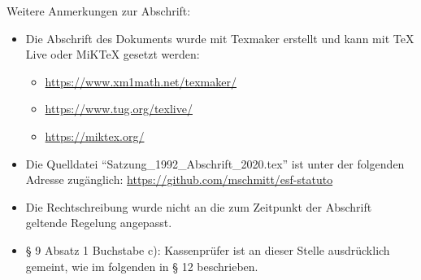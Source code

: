 \documentclass[11pt]{article}
\begin{document}
\begin{appendix}
Weitere Anmerkungen zur Abschrift:
\begin{itemize}
	\item Die Abschrift des Dokuments wurde mit Texmaker erstellt und kann mit TeX Live oder MiKTeX gesetzt werden:
	\begin{itemize}
		\item \url{https://www.xm1math.net/texmaker/}
		\item \url{https://www.tug.org/texlive/}
		\item \url{https://miktex.org/}
	\end{itemize}
	\item Die Quelldatei "`Satzung_1992_Abschrift_2020.tex"' ist unter der folgenden Adresse zugänglich: \url{https://github.com/mschmitt/esf-statuto}
	\item Die Rechtschreibung wurde nicht an die zum Zeitpunkt der Abschrift geltende Regelung angepasst.
	\item § 9 Absatz 1 Buchstabe c): Kassenprüfer ist an dieser Stelle ausdrücklich gemeint, wie im folgenden in § 12 beschrieben.
\end{itemize}

\end{appendix}
\end{document}

